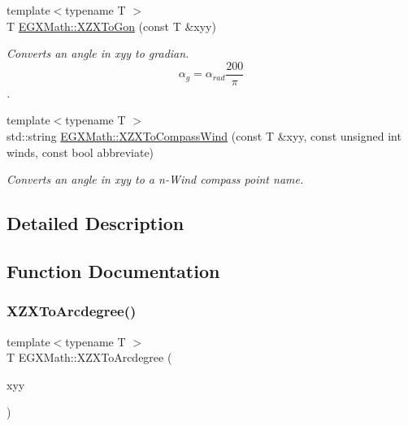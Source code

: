 \begin{DoxyCompactItemize}
{\footnotesize template$<$typename T $>$ }\\T \mbox{\hyperlink{group___e_g_x_math-_angle_conversions-_x_z_x_ga5b73732dd6ff688b3aa07629fc9acb44}{E\+G\+X\+Math\+::\+X\+Z\+X\+To\+Gon}} (const T \&xyy)
\begin{DoxyCompactList}\small\item\em Converts an angle in xyy to gradian. \[\alpha_{g}=\alpha_{rad}\frac{200}{\pi}\]. \end{DoxyCompactList}\item 
{\footnotesize template$<$typename T $>$ }\\std\+::string \mbox{\hyperlink{group___e_g_x_math-_angle_conversions-_x_z_x_gae450293733efffff773e954627860bf0}{E\+G\+X\+Math\+::\+X\+Z\+X\+To\+Compass\+Wind}} (const T \&xyy, const unsigned int winds, const bool abbreviate)
\begin{DoxyCompactList}\small\item\em Converts an angle in xyy to a n-\/\+Wind compass point name. \end{DoxyCompactList}\end{DoxyCompactItemize}


\subsection{Detailed Description}


\subsection{Function Documentation}
\mbox{\label{group___e_g_x_math-_angle_conversions-_x_z_x_gade03c99ea870f58dcebd6307beed2364}} 
\subsubsection{\texorpdfstring{X\+Z\+X\+To\+Arcdegree()}{XZXToArcdegree()}}
{\footnotesize\ttfamily template$<$typename T $>$ \\
T E\+G\+X\+Math\+::\+X\+Z\+X\+To\+Arcdegree (\begin{DoxyParamCaption}\item[{const T \&}]{xyy }\end{DoxyParamCaption})}



